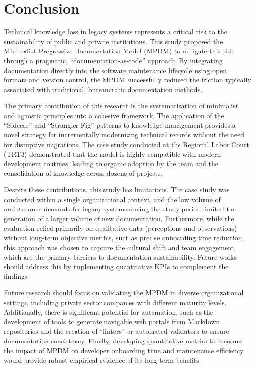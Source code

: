 \documentclass{ieeeaccess}
\begin{document}
\section{Conclusion}
Technical knowledge loss in legacy systems represents a critical risk to the sustainability of public and private institutions. This study proposed the Minimalist Progressive Documentation Model (MPDM) to mitigate this risk through a pragmatic, ``documentation-as-code'' approach. By integrating documentation directly into the software maintenance lifecycle using open formats and version control, the MPDM successfully reduced the friction typically associated with traditional, bureaucratic documentation methods.

The primary contribution of this research is the systematization of minimalist and agnostic principles into a cohesive framework. The application of the ``Sidecar'' and ``Strangler Fig'' patterns to knowledge management provides a novel strategy for incrementally modernizing technical records without the need for disruptive migrations. The case study conducted at the Regional Labor Court (TRT3) demonstrated that the model is highly compatible with modern development routines, leading to organic adoption by the team and the consolidation of knowledge across dozens of projects.

Despite these contributions, this study has limitations. The case study was conducted within a single organizational context, and the low volume of maintenance demands for legacy systems during the study period limited the generation of a larger volume of new documentation. Furthermore, while the evaluation relied primarily on qualitative data (perceptions and observations) without long-term objective metrics, such as precise onboarding time reduction, this approach was chosen to capture the cultural shift and team engagement, which are the primary barriers to documentation sustainability. Future works should address this by implementing quantitative KPIs to complement the findings.

Future research should focus on validating the MPDM in diverse organizational settings, including private sector companies with different maturity levels. Additionally, there is significant potential for automation, such as the development of tools to generate navigable web portals from Markdown repositories and the creation of ``linters'' or automated validators to ensure documentation consistency. Finally, developing quantitative metrics to measure the impact of MPDM on developer onboarding time and maintenance efficiency would provide robust empirical evidence of its long-term benefits.
\end{document}
